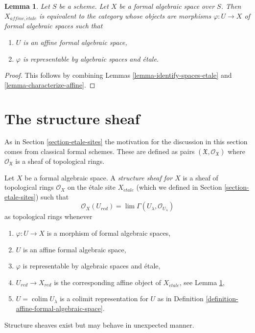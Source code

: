 \documentclass{stacks-project}
\theoremstyle{plain}
\newtheorem{lemma}[subsection]{Lemma}
\theoremstyle{definition}
\theoremstyle{remark}
\numberwithin{equation}{subsection}
\def\lim{\mathop{\mathrm{lim}}\nolimits}
\def\colim{\mathop{\mathrm{colim}}\nolimits}
\def\etale{{\acute{e}tale}}
\begin{document}
\begin{lemma}
\label{lemma-identify-affine-etale}
Let $S$ be a scheme. Let $X$ be a formal algebraic space over $S$.
Then $X_{affine, \etale}$ is equivalent to the category whose objects
are morphisms $\varphi : U \to X$ of formal algebraic spaces such that
\begin{enumerate}
\item $U$ is an affine formal algebraic space,
\item $\varphi$ is representable by algebraic spaces and \'etale.
\end{enumerate}
\end{lemma}

\begin{proof}
This follows by combining Lemmas \ref{lemma-identify-spaces-etale} and
\ref{lemma-characterize-affine}.
\end{proof}






\section{The structure sheaf}
\label{section-structure-sheaf}


\noindent
As in Section \ref{section-etale-sites} the motivation for the discussion
in this section comes from classical formal schemes. These are defined as pairs
$(\mathfrak X, \mathcal{O}_\mathfrak X)$ where $\mathcal{O}_\mathfrak X$
is a sheaf of topological rings.

\medskip\noindent
Let $X$ be a formal algebraic space. A {\it structure sheaf for $X$}
is a sheaf of topological rings $\mathcal{O}_X$ on the \'etale site
$X_\etale$ (which we defined in Section \ref{section-etale-sites}) such that
$$
\mathcal{O}_X(U_{red}) = \lim \Gamma(U_\lambda, \mathcal{O}_{U_\lambda})
$$
as topological rings whenever
\begin{enumerate}
\item $\varphi : U \to X$ is a morphism of formal algebraic spaces,
\item $U$ is an affine formal algebraic space,
\item $\varphi$ is representable by algebraic spaces and \'etale,
\item $U_{red} \to X_{red}$ is the corresponding affine object of
$X_\etale$, see
Lemma \ref{lemma-identify-affine-etale},
\item $U = \colim U_\lambda$ is a colimit representation for $U$ as in
Definition \ref{definition-affine-formal-algebraic-space}.
\end{enumerate}
Structure sheaves exist but may behave in unexpected manner.
\end{document}
